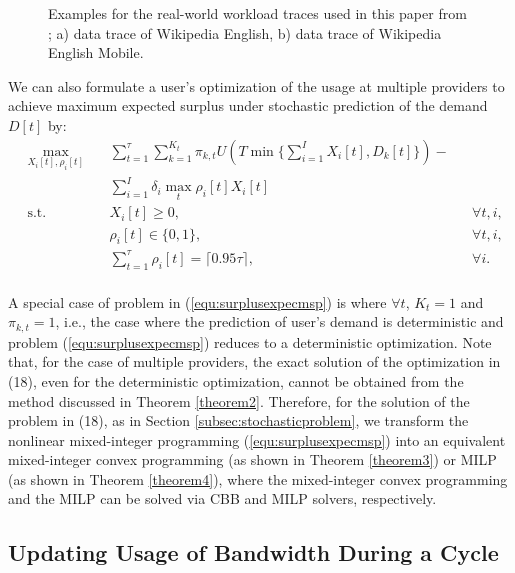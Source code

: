 \documentclass[10pt,journal,compsoc]{IEEEtran}
\begin{document}
\begin{figure}[t]
\centering
{}
\caption{Examples for the real-world workload traces used in this paper from \cite{Wikipageview}; a) data trace of Wikipedia English, b) data trace of Wikipedia English Mobile.}\label{fig:workload}
\end{figure}
We can also formulate a user's optimization of the usage at  multiple providers to achieve  maximum expected surplus under stochastic prediction of the  demand $ D[t]$ by:
\begin{equation}\label{equ:surplusexpecmsp}
\begin{aligned}
& \underset{X_{i}[t],\rho_{i}[t]}{\text{max}} \!\!\!\!\!\!\
& &  \sum_{t=1}^{\tau} {\sum_{k=1}^{K_{t}} {\pi_{k,t} U(T\min\{\sum_{i=1}^{I} X_{i}[t],D_k[t]\})}}-\\
&&& \sum_{i=1}^{I} \delta_{i}  \max_{t} \rho_{i}[t]X_{i}[t]\\
& \text{s.t.} & & X_{i}[t]\geq 0, && \forall t,i, \\
&&& \rho_{i}[t] \in \{0,1\}, && \forall t,i, \\
&&& \sum_{t=1}^{\tau} {\rho_{i}[t]}=\lceil0.95\tau\rceil, && \forall i. \\
\end{aligned}
\end{equation} 

A special case of problem in (\ref{equ:surplusexpecmsp}) is where  $\forall t$, $K_{t}=1$ and $\pi_{k,t}=1$, i.e.,  the case where the  prediction of user's demand is deterministic and problem (\ref{equ:surplusexpecmsp}) reduces to a deterministic optimization. 
Note that, for the case of multiple providers, the exact solution of the optimization in (18), even for the deterministic optimization, cannot be obtained from the method discussed in Theorem \ref{theorem2}.  
Therefore, for the solution of the problem in (18), as in Section \ref{subsec:stochasticproblem}, we  transform the nonlinear mixed-integer programming (\ref{equ:surplusexpecmsp}) into an equivalent mixed-integer convex programming (as shown in Theorem \ref{theorem3}) or MILP (as shown in Theorem \ref{theorem4}), where the mixed-integer convex programming and the MILP can be solved via CBB and MILP solvers, respectively.



\subsection{Updating Usage of  Bandwidth  During a  Cycle}\label{subsec:after}
\end{document}
